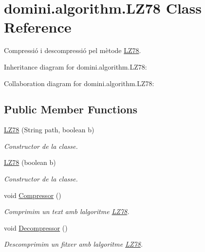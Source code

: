 \hypertarget{classdomini_1_1algorithm_1_1LZ78}{}\section{domini.\+algorithm.\+L\+Z78 Class Reference}
\label{classdomini_1_1algorithm_1_1LZ78}


Compressió i descompressió pel mètode \hyperlink{classdomini_1_1algorithm_1_1LZ78}{L\+Z78}.  




Inheritance diagram for domini.\+algorithm.\+L\+Z78\+:


Collaboration diagram for domini.\+algorithm.\+L\+Z78\+:
\subsection*{Public Member Functions}
\begin{DoxyCompactItemize}
\item 
\hyperlink{classdomini_1_1algorithm_1_1LZ78_a89c121da8ae75e24f1cf0d06530d0b89}{L\+Z78} (String path, boolean b)
\begin{DoxyCompactList}\small\item\em Constructor de la classe. \end{DoxyCompactList}\item 
\hyperlink{classdomini_1_1algorithm_1_1LZ78_abdeba774404b53d266e9fbe4aa35f757}{L\+Z78} (boolean b)
\begin{DoxyCompactList}\small\item\em Constructor de la classe. \end{DoxyCompactList}\item 
void \hyperlink{classdomini_1_1algorithm_1_1LZ78_a6ce2ce6b2ce14cbe5177f379becbb2d1}{Compressor} ()
\begin{DoxyCompactList}\small\item\em Comprimim un text amb l\textquotesingle{}algoritme \hyperlink{classdomini_1_1algorithm_1_1LZ78}{L\+Z78}. \end{DoxyCompactList}\item 
void \hyperlink{classdomini_1_1algorithm_1_1LZ78_a0872cb8224ffd478b992490df06f6ecf}{Decompressor} ()
\begin{DoxyCompactList}\small\item\em Descomprimim un fitxer amb l\textquotesingle{}algoritme \hyperlink{classdomini_1_1algorithm_1_1LZ78}{L\+Z78}. \end{DoxyCompactList}\end{DoxyCompactItemize}
